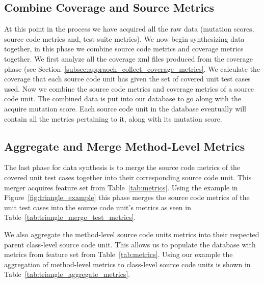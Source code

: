 \subsection{Combine Coverage and Source Metrics}
\label{subsec:appraoch_combine_metrics}
At this point in the process we have acquired all the raw data (mutation scores, source code metrics and, test suite metrics). We now begin synthesizing data together, in this phase we combine source code metrics and coverage metrics together. We first analyze all the coverage \gls{xml} files produced from the coverage phase (see Section~\ref{subsec:appraoch_collect_coverage_metrics}. We calculate the coverage that each source code unit has given the set of covered unit test cases used. Now we combine the source code metrics and coverage metrics of a source code unit. The combined data is put into our database to go along with the acquire mutation score. Each source code unit in the database eventually will contain all the metrics pertaining to it, along with its mutation score.


\subsection{Aggregate and Merge Method-Level Metrics}
\label{subsec:appraoch_aggregate_merge_metrics}
The last phase for data synthesis is to merge the source code metrics of the covered unit test cases together into their corresponding source code unit. This merger acquires feature set  from Table~\ref{tab:metrics}. Using the example in Figure~\ref{fig:triangle_example} this phase merges the source code metrics of the unit test cases into the source code unit's metrics as seen in Table~\ref{tab:triangle_merge_test_metrics}.

We also aggregate the method-level source code units metrics into their respected parent class-level source code unit. This allows us to populate the database with metrics from feature set  from Table~\ref{tab:metrics}. Using our example the aggregation of method-level metrics to class-level source code units is shown in Table~\ref{tab:triangle_aggregate_metrics}.

